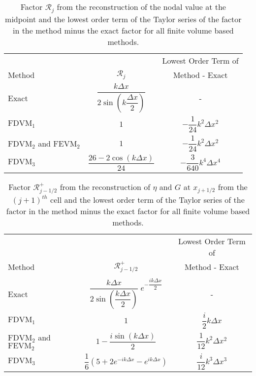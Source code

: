 \begin{table}
	\centering
	\begin{tabular}{l  c  c}
		&&Lowest Order Term of	\\
		Method& $\mathcal{R}_j$& Method - Exact  \B \\
		\hline 
		Exact &$\dfrac{k\Delta x}{2 \sin \left(k\dfrac{\Delta x}{2}\right)}$ & - \T \B \\
		$\text{FDVM}_1$ & $1$ & $-\dfrac{1}{24}k^2 \Delta x^2$ \T \B \\
		$\text{FDVM}_2$ and $\text{FEVM}_2$& $1$ & $-\dfrac{1}{24}k^2 \Delta x^2$ \T \B \\
		$\text{FDVM}_3$& $\dfrac{26 - 2 \cos\left(k \Delta x\right)}{24}$ & $-\dfrac{3}{640}k^4 \Delta x^4$ \T \B  \\
		\hline	\end{tabular}
	\caption{Factor $\mathcal{R}_j$ from the reconstruction of the nodal value at the midpoint and the lowest order term of the Taylor series of the factor in the method minus the exact factor for all finite volume based methods.}
	\label{tab:Mfactor}
\end{table}
\begin{table}
	\centering
	\begin{tabular}{l  c  c}
		&&Lowest Order Term of	\\
		Method & $\mathcal{R}^+_{j-1/2}$ & Method - Exact \B\\
		\hline \\
		Exact & $\dfrac{k\Delta x}{2 \sin\left(\dfrac{k \Delta x}{2}\right)}\; e^{-\dfrac{ik\Delta x}{2}}$ & -   \T\B\\
		$\text{FDVM}_1$ & $1$ & $\dfrac{i}{2}k \Delta x$ \T\B \\
		$\text{FDVM}_2$ and $\text{FEVM}_2$& $ 1 - \dfrac{i \sin\left(k\Delta x \right)}{2}$ & $\dfrac{1}{12}k^2 \Delta x^2$  \T\B\\
		$\text{FDVM}_3$& $\dfrac{1}{6}\left({5 + 2e^{-i k {\Delta x}} - e^{i k {\Delta x}}} \right)$ & $\dfrac{i}{12}k^3 \Delta x^3$  \T\B \\
		\hline
	\end{tabular}
	\caption{Factor $\mathcal{R}^+_{j-1/2}$ from the reconstruction of $\eta$ and $G$ at $x_{j+1/2}$ from the ${(j+1)^{th}}$ cell and the lowest order term of the Taylor series of the factor in the method minus the exact factor for all finite volume based methods. }
	\label{tab:Rpfactor}
\end{table}
